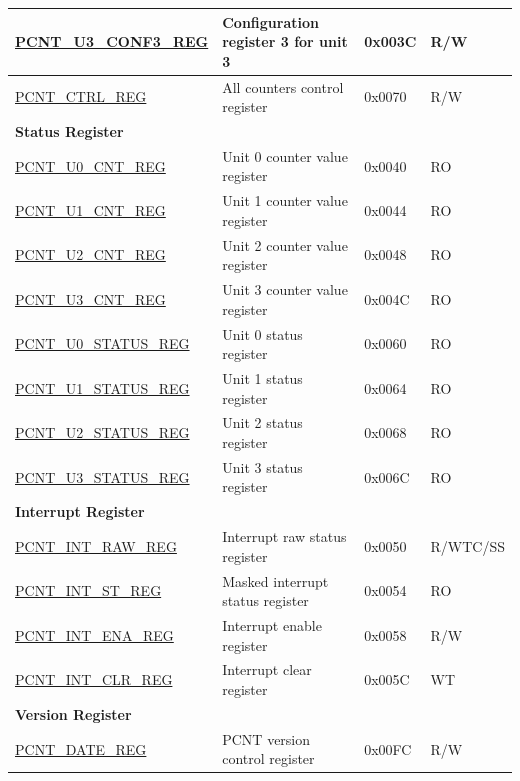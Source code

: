 \begin{longtable}{ | p{6cm} | p{7.2cm} | p{1.3cm} | p{1cm} | }
\hyperref[regdesc:PCNTUNCONF3REG]{PCNT\_U3\_CONF3\_REG} & Configuration register 3 for unit 3 & 0x003C & R/W \\ \hline
\hyperref[regdesc:PCNTCTRLREG]{PCNT\_CTRL\_REG} & All counters control register & 0x0070 & R/W \\ \hline
\multicolumn{4}{|l|}{\textbf{Status Register}} \\ \hline
\hyperref[regdesc:PCNTUNCNTREG]{PCNT\_U0\_CNT\_REG} & Unit 0 counter value register & 0x0040 & RO \\ \hline
\hyperref[regdesc:PCNTUNCNTREG]{PCNT\_U1\_CNT\_REG} & Unit 1 counter value register & 0x0044 & RO \\ \hline
\hyperref[regdesc:PCNTUNCNTREG]{PCNT\_U2\_CNT\_REG} & Unit 2 counter value register & 0x0048 & RO \\ \hline
\hyperref[regdesc:PCNTUNCNTREG]{PCNT\_U3\_CNT\_REG} & Unit 3 counter value register & 0x004C & RO \\ \hline
\hyperref[regdesc:PCNTUNSTATUSREG]{PCNT\_U0\_STATUS\_REG} & Unit 0 status register & 0x0060 & RO \\ \hline
\hyperref[regdesc:PCNTUNSTATUSREG]{PCNT\_U1\_STATUS\_REG} & Unit 1 status register & 0x0064 & RO \\ \hline
\hyperref[regdesc:PCNTUNSTATUSREG]{PCNT\_U2\_STATUS\_REG} & Unit 2 status register & 0x0068 & RO \\ \hline
\hyperref[regdesc:PCNTUNSTATUSREG]{PCNT\_U3\_STATUS\_REG} & Unit 3 status register & 0x006C & RO \\ \hline
\multicolumn{4}{|l|}{\textbf{Interrupt Register}} \\ \hline
\hyperref[regdesc:PCNTINTRAWREG]{PCNT\_INT\_RAW\_REG} & Interrupt raw status register & 0x0050 & R/WTC/SS \\ \hline
\hyperref[regdesc:PCNTINTSTREG]{PCNT\_INT\_ST\_REG} & Masked interrupt status register & 0x0054 & RO \\ \hline
\hyperref[regdesc:PCNTINTENAREG]{PCNT\_INT\_ENA\_REG} & Interrupt enable register & 0x0058 & R/W \\ \hline
\hyperref[regdesc:PCNTINTCLRREG]{PCNT\_INT\_CLR\_REG} & Interrupt clear register & 0x005C & WT \\ \hline
\multicolumn{4}{|l|}{\textbf{Version Register}} \\ \hline
\hyperref[regdesc:PCNTDATEREG]{PCNT\_DATE\_REG} & PCNT version control register & 0x00FC & R/W \\ \hline
\end{longtable}
